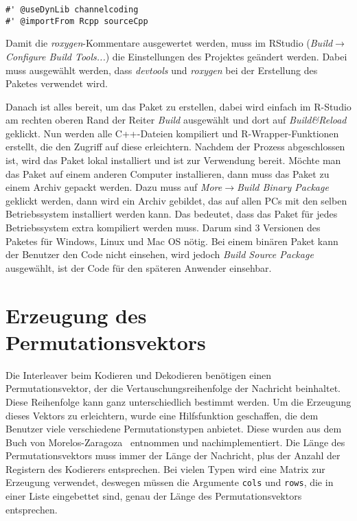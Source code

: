 \begin{lstlisting}[caption=Nötige \emph{roxygen}-Kommentare bei der Verwendung von C++-Code, label={lst:rcppNamespace}, float=!th]
#' @useDynLib channelcoding
#' @importFrom Rcpp sourceCpp
\end{lstlisting}

Damit die \emph{roxygen}-Kommentare ausgewertet werden, muss im RStudio (\emph{Build$\rightarrow$Configure Build Tools...}) die Einstellungen des Projektes geändert werden. Dabei muss ausgewählt werden, dass \emph{devtools} und \emph{roxygen} bei der Erstellung des Paketes verwendet wird.

Danach ist alles bereit, um das Paket zu erstellen, dabei wird einfach im R-Studio am rechten oberen Rand der Reiter \emph{Build} ausgewählt und dort auf \emph{Build\&Reload} geklickt. Nun werden alle C++-Dateien kompiliert und R-Wrapper-Funktionen erstellt, die den Zugriff auf diese erleichtern. Nachdem der Prozess abgeschlossen ist, wird das Paket lokal installiert und ist zur Verwendung bereit. Möchte man das Paket auf einem anderen Computer installieren, dann muss das Paket zu einem Archiv gepackt werden. Dazu muss auf \emph{More$\rightarrow$Build Binary Package} geklickt werden, dann wird ein Archiv gebildet, das auf allen PCs mit den selben Betriebssystem installiert werden kann. Das bedeutet, dass das Paket für jedes Betriebssystem extra kompiliert werden muss. Darum sind 3 Versionen des Paketes für Windows, Linux und Mac OS nötig. Bei einem binären Paket kann der Benutzer den Code nicht einsehen, wird jedoch \emph{Build Source Package} ausgewählt, ist der Code für den späteren Anwender einsehbar.   

\section{Erzeugung des Permutationsvektors}
\label{sec:implementation_permutation}
Die Interleaver beim Kodieren und Dekodieren benötigen einen Permutationsvektor, der die Vertauschungsreihenfolge der Nachricht beinhaltet. Diese Reihenfolge kann ganz unterschiedlich bestimmt werden. Um die Erzeugung dieses Vektors zu erleichtern, wurde eine Hilfsfunktion geschaffen, die dem Benutzer viele verschiedene Permutationstypen anbietet. Diese wurden aus dem Buch von Morelos-Zaragoza~\cite{morelos2006art} entnommen und nachimplementiert. Die Länge des Permutationsvektors muss immer der Länge der Nachricht, plus der Anzahl der Registern des Kodierers entsprechen. Bei vielen Typen wird eine Matrix zur Erzeugung verwendet, deswegen müssen die Argumente \texttt{cols} und \texttt{rows}, die in einer Liste eingebettet sind, genau der Länge des Permutationsvektors entsprechen.

